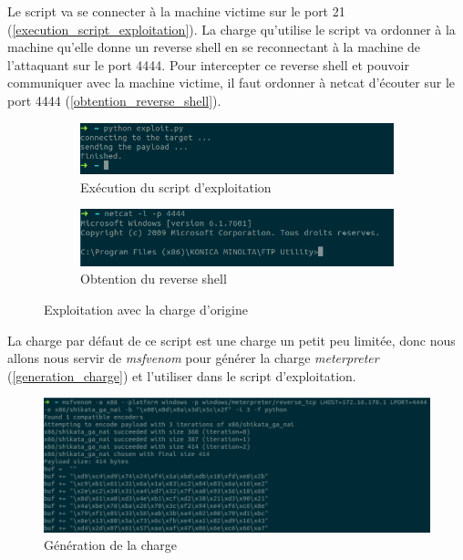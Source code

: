     Le script va se connecter à la machine victime sur le port 21 (\autoref{execution_script_exploitation}). 
    La charge qu'utilise le script va ordonner à la machine qu'elle donne un reverse shell en se reconnectant à 
    la machine de l'attaquant sur le port 4444. Pour intercepter ce reverse shell et pouvoir communiquer avec
    la machine victime, il faut ordonner à netcat d'écouter sur le port 4444 (\autoref{obtention_reverse_shell}).

    \begin{figure}[h!]
        \centering
        \begin{subfigure}{0.9\textwidth}
            \centering
            \includegraphics[width=\textwidth]{images/exploit_python.png}
            \caption{Exécution du script d'exploitation}
            \label{execution_script_exploitation}
        \end{subfigure}
        \hfill
        \begin{subfigure}{0.9\textwidth}
            \centering
            \includegraphics[width=\textwidth]{images/reverse_shell.png}
            \caption{Obtention du reverse shell}
            \label{obtention_reverse_shell}
        \end{subfigure}
        \hfill
        \caption{Exploitation avec la charge d'origine}
        \label{exploitation_avec_charge_origine}
    \end{figure}

    La charge par défaut de ce script est une charge un petit peu limitée, donc nous allons nous servir 
    de \emph{msfvenom} pour générer la charge \emph{meterpreter} (\autoref{generation_charge}) et l'utiliser 
    dans le script d'exploitation.
    \begin{figure}[h]
        \centering
        \includegraphics[width=\linewidth]{images/msfvenom.png}
        \caption{Génération de la charge}
        \label{generation_charge}
    \end{figure}

